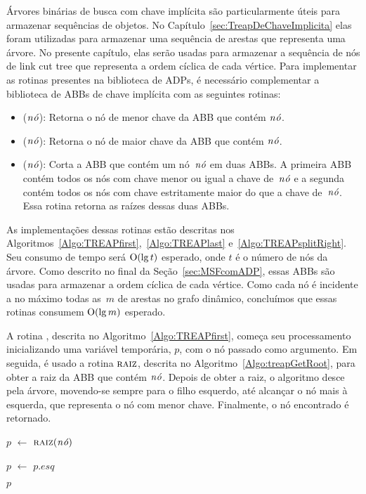 Árvores binárias de busca com chave implícita são particularmente úteis para armazenar sequências de objetos.
No Capítulo~\ref{sec:TreapDeChaveImplicita} elas foram utilizadas para armazenar uma sequência de arestas que representa uma árvore.
No presente capítulo, elas serão usadas para armazenar a sequência de nós de link cut tree que representa a ordem cíclica de cada vértice.
Para implementar as rotinas presentes na biblioteca de ADPs, é necessário complementar a biblioteca de ABBs de chave implícita com as seguintes rotinas:
\begin{itemize}
\item \treapFirst($\node$): Retorna o nó de menor chave da ABB que contém $\node$.
\item \treapLast($\node$): Retorna o nó de maior chave da ABB que contém $\node$.
\item \treapSplitRight($\node$): Corta a ABB que contém um nó~$\node$ em duas ABBs. A primeira ABB contém todos os nós com chave menor ou igual a chave de~$\node$ e a segunda contém todos os nós com chave estritamente maior do que a chave de~$\node$. Essa rotina retorna as raízes dessas duas ABBs.
\end{itemize}

As implementações dessas rotinas estão descritas nos Algoritmos~\ref{Algo:TREAPfirst},~\ref{Algo:TREAPlast} e~\ref{Algo:TREAPsplitRight}.
Seu consumo de tempo será $\mathrm{O}(\lg t)$ esperado, onde $t$ é o número de nós da árvore.
Como descrito no final da Seção~\ref{sec:MSFcomADP}, essas ABBs são usadas para armazenar a ordem cíclica de cada vértice.
Como cada nó é incidente a no máximo todas as~$m$ de arestas no grafo dinâmico, concluímos que essas rotinas consumem $\mathrm{O}(\lg m)$ esperado.  

A rotina \treapFirst{}, descrita no Algoritmo~\ref{Algo:TREAPfirst}, começa seu processamento inicializando uma variável temporária, $p$, com o nó passado como argumento.
Em seguida, é usado a rotina $\text{\scshape raiz}$, descrita no Algoritmo~\ref{Algo:treapGetRoot}, para obter a raiz da ABB que contém $\node$.
Depois de obter a raiz, o algoritmo desce pela árvore, movendo-se sempre para o filho esquerdo, até alcançar o nó mais à esquerda, que representa o nó com menor chave.
Finalmente, o nó encontrado é retornado.

\begin{algorithm}
\caption{\treapFirst($\node$)}
\label{Algo:TREAPfirst}
\begin{algorithmic}[1]
\State $p$ $\gets$ $\text{\scshape raiz}(\mathit{n\acute{o}})$

  \State $p$ $\gets$ $p$.$esq$
\EndWhile

\State\Return $p$
\end{algorithmic}
\end{algorithm}

